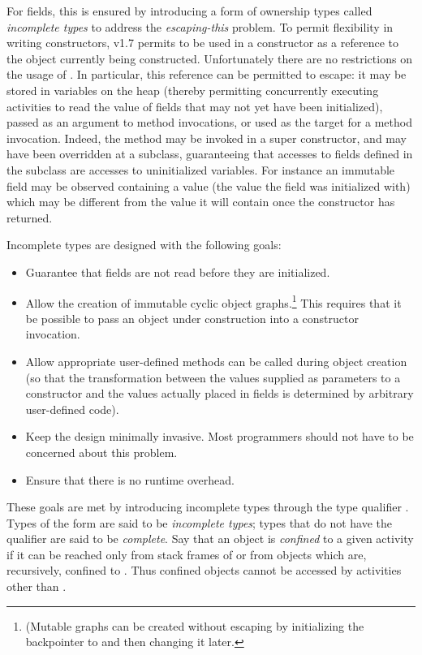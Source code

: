 For fields, this is ensured by introducing a form of ownership types
called {\em incomplete types} to address the {\em escaping-this}
problem.  To permit flexibility in writing constructors, \Xten{} v1.7
permits  to be used in a constructor as a reference to the
object currently being constructed. Unfortunately there are no
restrictions on the usage of . In particular, this reference
can be permitted to escape: it may be stored in variables on the heap
(thereby permitting concurrently executing activities to read the
value of fields that may not yet have been initialized), passed as an
argument to method invocations, or used as the target for a method
invocation. Indeed, the method may be invoked in a super constructor,
and may have been overridden at a subclass, guaranteeing that accesses
to fields defined in the subclass are accesses to uninitialized
variables. For instance an immutable field may be observed containing
a value (the value the field was initialized with) which may be
different from the value it will contain once the constructor has
returned.

Incomplete types are designed with the following goals:
 \begin{itemize}

\item Guarantee that fields are not read before they are initialized.

\item  Allow the creation of immutable cyclic object graphs.\footnote{(Mutable
       graphs can be created without escaping  
    by initializing the backpointer to  and then
    changing it later.}  This requires that it be possible to pass an
  object under construction into a constructor invocation.

\item Allow appropriate user-defined methods can be called during object
  creation (so that the transformation between the values supplied as
  parameters to a constructor and the values actually placed in fields
  is determined by arbitrary user-defined code).

\item Keep the design minimally invasive. Most programmers should
  not have to be concerned about this problem.

\item Ensure that there is no runtime overhead. 
\end{itemize}

These goals are met by introducing incomplete types through the type
qualifier . Types of the form  are said to be
{\em incomplete types}; types that do not have the qualifier are said to be
{\em complete}.
 Say that an object  is {\em confined}
to a given activity  if it can be reached only from stack
frames of  or from objects which are, recursively, confined to
. Thus confined objects cannot be accessed by activities other
than .


